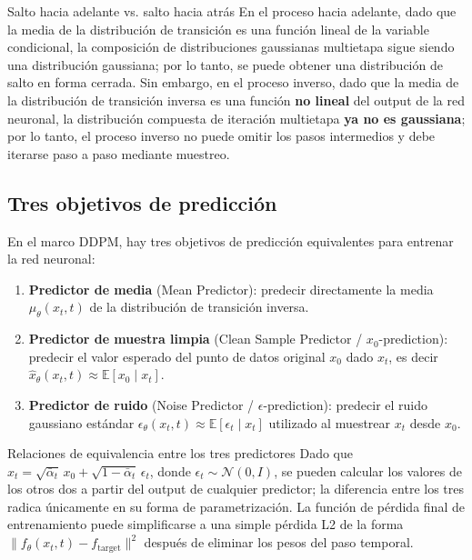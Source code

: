 \documentclass[a4paper]{article}
\begin{document}
\begin{knowledgebox}{Salto hacia adelante vs. salto hacia atrás}
En el proceso hacia adelante, dado que la media de la distribución de transición es una función lineal de la variable condicional, la composición de distribuciones gaussianas multietapa sigue siendo una distribución gaussiana; por lo tanto, se puede obtener una distribución de salto en forma cerrada. Sin embargo, en el proceso inverso, dado que la media de la distribución de transición inversa es una función \textbf{no lineal} del output de la red neuronal, la distribución compuesta de iteración multietapa \textbf{ya no es gaussiana}; por lo tanto, el proceso inverso no puede omitir los pasos intermedios y debe iterarse paso a paso mediante muestreo.
\end{knowledgebox}

\subsection{Tres objetivos de predicción}

En el marco DDPM, hay tres objetivos de predicción equivalentes para entrenar la red neuronal:

\begin{enumerate}
    \item \textbf{Predictor de media} (Mean Predictor): predecir directamente la media $\mu_\theta(x_t, t)$ de la distribución de transición inversa.
    \item \textbf{Predictor de muestra limpia} (Clean Sample Predictor / $x_0$-prediction): predecir el valor esperado del punto de datos original $x_0$ dado $x_t$, es decir $\hat{x}_\theta(x_t, t) \approx \mathbb{E}[x_0 \mid x_t]$.
    \item \textbf{Predictor de ruido} (Noise Predictor / $\epsilon$-prediction): predecir el ruido gaussiano estándar $\epsilon_\theta(x_t, t) \approx \mathbb{E}[\epsilon_t \mid x_t]$ utilizado al muestrear $x_t$ desde $x_0$.
\end{enumerate}

\begin{knowledgebox}{Relaciones de equivalencia entre los tres predictores}
Dado que $x_t = \sqrt{\bar{\alpha}_t}\, x_0 + \sqrt{1-\bar{\alpha}_t}\, \epsilon_t$, donde $\epsilon_t \sim \mathcal{N}(0, I)$, se pueden calcular los valores de los otros dos a partir del output de cualquier predictor; la diferencia entre los tres radica únicamente en su forma de parametrización. La función de pérdida final de entrenamiento puede simplificarse a una simple pérdida L2 de la forma $\|f_\theta(x_t, t) - f_{\text{target}}\|^2$ después de eliminar los pesos del paso temporal.
\end{knowledgebox}
\end{document}
